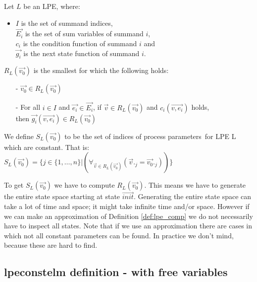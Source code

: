 \index{}\documentclass[a4paper,10pt]{article}
\theoremstyle{plain}
\theoremstyle{definition}
\newcommand{\ovr}{\overrightarrow}
\newcommand{\pps}{process parameters}
\begin{document}
\begin{defn}\label{def:lpe} Let $L$ be an LPE, where: \\ 
\begin{itemize}
\item $I$ is the set of summand indices, \\ $\ovr{E_i}$ is the set of sum variables of summand $i$, \\ $c_i$ is the condition function of summand $i$ and \\ $\ovr{g_i}$ is the next state function of summand $i$.
\end{itemize}

$R_L(\ovr{v_0})$ is the smallest for which the following holds:
  \begin{itemize}
    \item[-] $\ovr{v_0} \in R_L(\ovr{v_0})$
    \item[-] For all $i \in I$ and $\ovr{e_i} \in \ovr{E_i}$, if $\ovr{v} \in R_L(\ovr{v_0})$ and $c_i(\ovr{v, e_i})$ holds, \\ then $\ovr{g_i}(\ovr{v, e_i}) \in R_L(\ovr{v_0})$ \\
   \end{itemize}
\end{defn}

\begin{defn}\label{def:lpe_comp} We define $S_L(\ovr{v_0})$ to be the set of indices of \pps\ for LPE L which are constant. That is:\\

$S_L(\ovr{v_0}) = \lbrace j \in  \lbrace 1, \ldots, n \rbrace \vert (\forall_{\ovr{v} \in R_L(\ovr{v_0})}( \ovr{v}._j = \ovr{v_{0}}._j)) \rbrace $
\end{defn}

To get $S_L(\ovr{v_0})$ we have to compute $R_L(\ovr{v_0})$. This means we have to generate the entire state space starting at state $\ovr{init}$. Generating the entire state space can take a lot of time and space; it might take infinite time and/or space. However if we can make an approximation of Definition \ref{def:lpe_comp} we do not necessarily have to inspect all states. Note that if we use an approximation there are cases in which not all constant parameters can be found. In practice we don't mind, because these are hard to find.

\subsection{lpeconstelm definition - with free variables}
\end{document}
